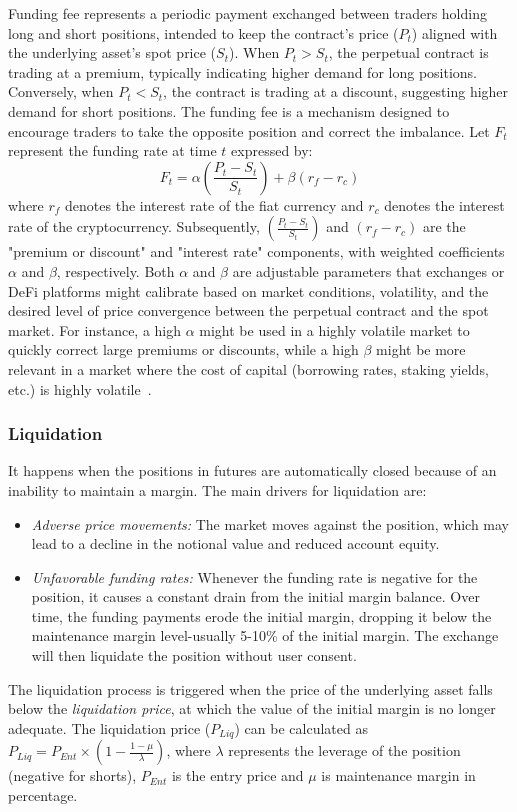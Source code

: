 Funding fee represents a periodic payment exchanged between traders holding long and short positions, intended to keep the contract's price (\(P_t\)) aligned with the underlying asset's spot price (\(S_t\)). When \(P_t > S_t\), the perpetual contract is trading at a premium, typically indicating higher demand for long positions. Conversely, when \(P_t < S_t\), the contract is trading at a discount, suggesting higher demand for short positions. The funding fee is a mechanism designed to encourage traders to take the opposite position and correct the imbalance. Let \(F_t\) represent the funding rate at time \(t\) expressed by:
\begin{equation}\label{eq:funding1}
	F_t = \alpha \left( \frac{P_t - S_t}{S_t} \right) + \beta \left( r_f - r_c \right)
\end{equation}
where \( r_f \) denotes the interest rate of the fiat currency and \( r_c \) denotes the interest rate of the cryptocurrency. Subsequently, \((\frac{P_t - S_t}{S_t})\) and \((r_f - r_c)\) are the "premium or discount" and "interest rate" components, with weighted coefficients \( \alpha \) and \( \beta \), respectively. Both \( \alpha \) and \( \beta \) are adjustable parameters that exchanges or DeFi platforms might calibrate based on market conditions, volatility, and the desired level of price convergence between the perpetual contract and the spot market. For instance, a high \( \alpha \) might be used in a highly volatile market to quickly correct large premiums or discounts, while a high \( \beta \) might be more relevant in a market where the cost of capital (borrowing rates, staking yields, etc.) is highly volatile~\cite{Binance_Funding,BitMEX_Funding}.

\subsubsection{Liquidation}\label{subsec:liquidation}
It happens when the positions in futures are automatically closed because of an inability to maintain a margin. The main drivers for liquidation are:
\begin{itemize}
	\item \textsl{Adverse price movements:} The market moves against the position, which may lead to a decline in the notional value and reduced account equity.
	
	\item \textsl{Unfavorable funding rates:} Whenever the funding rate is negative for the position, it causes a constant drain from the initial margin balance. Over time, the funding payments erode the initial margin, dropping it below the maintenance margin level-usually 5-10\% of the initial margin. The exchange will then liquidate the position without user consent.
\end{itemize}
The liquidation process is triggered when the price of the underlying asset falls below the \textit{liquidation price}, at which the value of the initial margin is no longer adequate. The liquidation price ($P_{Liq}$) can be calculated as \(P_{Liq} = P_{Ent} \times \left( 1 - \frac{1 - \mu}{\lambda} \right)\), where \(\lambda\) represents the leverage of the position (negative for shorts), \(P_{Ent}\) is the entry price and \(\mu\) is maintenance margin in percentage.

